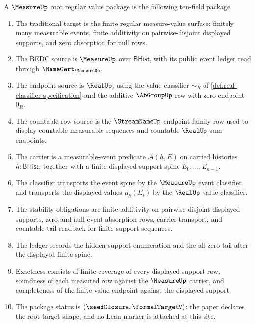 \begin{definition}
\label{def:measure-root-regular-value-package}
A $\MeasureUp$ root regular value package is the following ten-field package.
\begin{enumerate}
  \item The traditional target is the finite regular measure-value surface:
  finitely many measurable events, finite additivity on pairwise-disjoint
  displayed supports, and zero absorption for null rows.
  \item The BEDC source is $\MeasureUp$ over $\mathsf{BHist}$, with its
  public event ledger read through $\NameCert_{\MeasureUp}$.
  \item The endpoint source is $\RealUp$, using the value classifier
  $\sim_R$ of \autoref{def:real-classifier-specification} and the additive
  $\AbGroupUp$ row with zero endpoint $0_R$.
  \item The countable row source is the $\StreamNameUp$ endpoint-family row
  used to display countable measurable sequences and countable $\RealUp$
  sum endpoints.
  \item The carrier is a measurable-event predicate
  $\mathcal{A}(h,E)$ on carried histories $h:\mathsf{BHist}$, together with a
  finite displayed support spine $E_0,\ldots,E_{n-1}$.
  \item The classifier transports the event spine by the $\MeasureUp$ event
  classifier and transports the displayed values $\mu_h(E_i)$ by the
  $\RealUp$ value classifier.
  \item The stability obligations are finite additivity on pairwise-disjoint
  displayed supports, zero and null-event absorption rows, carrier transport,
  and countable-tail readback for finite-support sequences.
  \item The ledger records the hidden support enumeration and the all-zero
  tail after the displayed finite spine.
  \item Exactness consists of finite coverage of every displayed support row,
  soundness of each measured row against the $\MeasureUp$ carrier, and
  completeness of the finite value endpoint against the displayed support.
  \item The package status is $(\seedClosure,\formalTargetV)$: the paper
  declares the root target shape, and no Lean marker is attached at this site.
\end{enumerate}
\end{definition}


